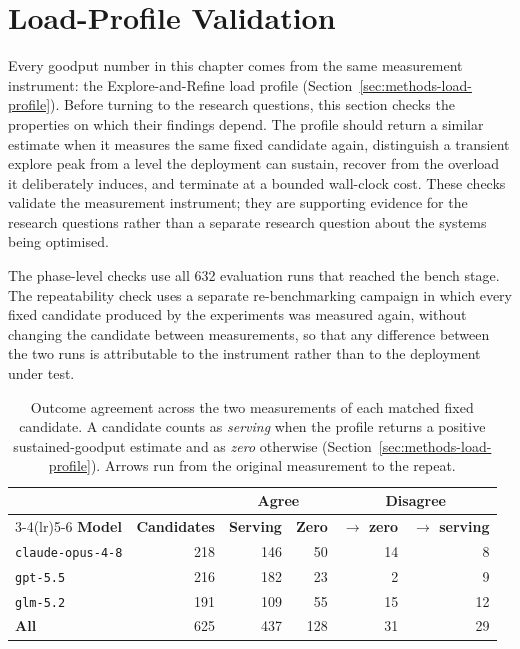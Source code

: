 
\section{Load-Profile Validation}
\label{sec:results-load-profile-validation}
\label{sec:results-rq2}

Every goodput number in this chapter comes from the same measurement
instrument: the Explore-and-Refine load profile
(Section~\ref{sec:methods-load-profile}). Before turning to the research
questions, this section checks the properties on which their findings depend.
The profile should return a similar estimate when it measures the same fixed
candidate again, distinguish a transient explore peak from a level the
deployment can sustain, recover from the overload it deliberately induces,
and terminate at a bounded wall-clock cost. These checks validate the
measurement instrument; they are supporting evidence for the research
questions rather than a separate research question about the systems being
optimised.

The phase-level checks use all 632 evaluation runs that reached the bench
stage. The repeatability check uses a separate re-benchmarking campaign in
which every fixed candidate produced by the experiments was measured again,
without changing the candidate between measurements, so that any difference
between the two runs is attributable to the instrument rather than to the
deployment under test.

\begin{table}[H]
  \centering
  \caption{Outcome agreement across the two measurements of each matched
    fixed candidate. A candidate counts as \emph{serving} when the profile
    returns a positive sustained-goodput estimate and as \emph{zero}
    otherwise (Section~\ref{sec:methods-load-profile}). Arrows run from the
    original measurement to the repeat.}
  \label{tab:results-load-profile-concordance}
  \footnotesize
  \begin{tabular}{@{}lrrrrr@{}}
    \toprule
    & & \multicolumn{2}{c}{\textbf{Agree}} & \multicolumn{2}{c}{\textbf{Disagree}} \\
    \cmidrule(lr){3-4}\cmidrule(lr){5-6}
    \textbf{Model} & \textbf{Candidates} & \textbf{Serving} & \textbf{Zero} &
    \textbf{$\to$ zero} & \textbf{$\to$ serving} \\
    \midrule
    \texttt{claude-opus-4-8} & 218 & 146 & 50 & 14 & 8 \\
    \texttt{gpt-5.5}         & 216 & 182 & 23 & 2  & 9 \\
    \texttt{glm-5.2}         & 191 & 109 & 55 & 15 & 12 \\
    \midrule
    \textbf{All}             & 625 & 437 & 128 & 31 & 29 \\
    \bottomrule
  \end{tabular}
\end{table}

